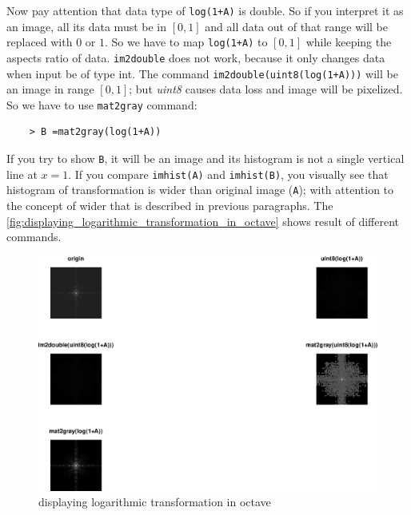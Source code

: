 Now pay attention that data type of \texttt{log(1+A)} is double. So if you
interpret it as an image, all its data must be in $[0,1]$ and all data out
of that range will be replaced with $0$ or $1$. So we have to map
\texttt{log(1+A)} to $[0,1]$ while keeping the aspects ratio of data.
\texttt{im2double} does not work, because it only changes data when input be
of type int. The command \texttt{im2double(uint8(log(1+A)))} will be an
image in range $[0,1]$; but \emph{uint8} causes data loss and image will be
pixelized. So we have to use \texttt{mat2gray} command: 
\begin{Verbatim}
    > B =mat2gray(log(1+A))
\end{Verbatim}
If you try to show \texttt{B}, it will be an image and its histogram is not a
single vertical line at $x = 1$. If you compare \texttt{imhist(A)} and
\texttt{imhist(B)}, you visually see that histogram of transformation is wider
than original image (\texttt{A}); with attention to the concept of wider that is
described in previous paragraphs. The
\autoref{fig:displaying_logarithmic_transformation_in_octave} shows result of
different commands.
    \begin{figure}[htb!]
        \includegraphics[scale=0.4]{displaying_logarithmic_transformation_in_octave.eps}
        \centering
        \caption{displaying logarithmic transformation in octave}
        \label{fig:displaying_logarithmic_transformation_in_octave}
    \end{figure}
